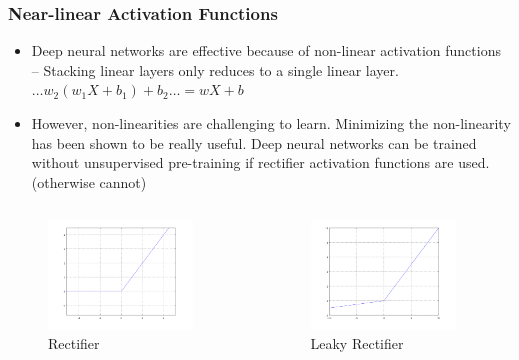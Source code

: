 \documentclass[8pt]{beamer}
\begin{document}
\begin{frame}
\frametitle{Near-linear Activation Functions}
 \begin{itemize}
  \item Deep neural networks are effective because of non-linear activation functions – Stacking linear
        layers only reduces to a single linear layer. $ \dots w_2(w_1 X + b_1) + b_2 \dots = wX + b $
  \item However, non-linearities are challenging to learn. Minimizing the non-linearity has been shown to
        be really useful. Deep neural networks can be trained without unsupervised pre-training if rectifier
        activation functions are used. (otherwise cannot)
 \end{itemize}
\begin{columns}
\begin{column}{0.5\textwidth}
 \begin{figure}[h]
   \caption{Rectifier}
   \includegraphics[width=0.9\textwidth]{./rect.png}
 \end{figure}
\end{column}
\begin{column}{0.5\textwidth}
 \begin{figure}[h]
   \caption{Leaky Rectifier}
   \includegraphics[width=0.9\textwidth]{./leaky_rect.png}
 \end{figure}
\end{column}
\end{columns}
\end{frame}
\end{document}
